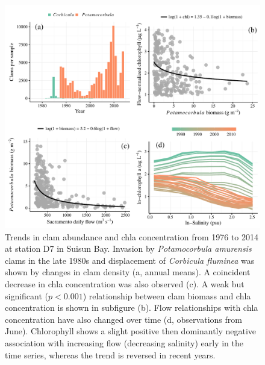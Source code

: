 \documentclass[journal = esthag, manuscript = article]{achemso}\usepackage[]{graphicx}\usepackage[]{color}
\begin{document}
\begin{figure}[!ht]

{\centering \includegraphics[width=\textwidth]{figs/clmchl-1} 

}

\caption{Trends in clam abundance and \ac{chla} concentration from 1976 to 2014 at station D7 in Suisun Bay.  Invasion by \textit{Potamocorbula amurensis} clams in the late 1980s and displacement of \textit{Corbicula fluminea} was shown by changes in clam density (a, annual means).  A coincident decrease in \ac{chla} concentration was also observed (c).  A weak but significant ($p < 0.001$) relationship between clam biomass and \ac{chla} concentration is shown in subfigure (b).  Flow relationships with \ac{chla} concentration have also changed over time (d, observations from June). Chlorophyll shows a slight positive then dominantly negative association with increasing flow (decreasing salinity) early in the time series, whereas the trend is reversed in recent years.}\label{fig:clmchl}
\end{figure}
\end{document}
